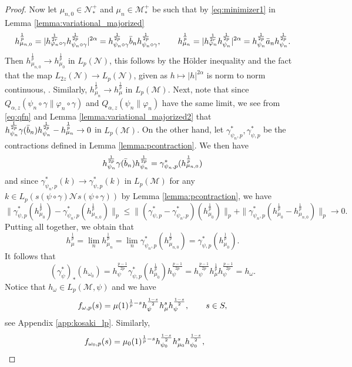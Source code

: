 \documentclass[12pt]{article}
\theoremstyle{definition}
\theoremstyle{remark}
\numberwithin{equation}{section}
\def\Me{\mathcal M}
\def\Ne{\mathcal N}
\def\ffi{\varphi}
\begin{document}
\begin{proof}
Now let $\mu_{n,0}\in \Ne_*^+$ and $\mu_n\in \Me_*^+$ be such that by  \eqref{eq:minimizer1}
in Lemma \ref{lemma:variational_majorized}
\begin{align*}
h_{\mu_{n,0}}^{\frac 1p}= |h_{\ffi_n\circ\gamma}^{1\over 2r}h_{\psi_n\circ\gamma}^{1\over 2p}|^{2\alpha}=
h_{\psi_n\circ\gamma}^{\frac 1{2p}}\bar b_{n}
h_{\psi_n\circ\gamma}^{\frac1{2p}},\qquad
h_{\mu_{n}}^{\frac1p}=|h_{\ffi_n}^{1\over 2r}h_{\psi_n}^{1\over 2p}|^{2\alpha}= h_{\psi_n}^{\frac 1{2p}}\bar a_{n}
h_{\psi_n}^{\frac1{2p}}. 
\end{align*}
Then $h_{\mu_{n,0}}^{\frac1p}\to h_{\mu_0}^{\frac1p}$ in $L_p(\Ne)$, this follows by the H\"older
inequality and the fact that the map $L_{2z}(\Ne)\to L_p(\Ne)$, given as $h\mapsto
|h|^{2\alpha}$ is norm to norm continuous, \cite{kosaki1986aplicationsuc}. Similarly,
$h_{\mu_n}^{\frac1p}\to h_\mu^{\frac1p}$ in $L_p(\Me)$. 
Next, note that since
$Q_{\alpha,z}(\psi_n\circ\gamma\|\ffi_n\circ\gamma)$ and $Q_{\alpha,z}(\psi_n\|\ffi_n)$
have the same limit, we see from \eqref{eq:qfn} and Lemma
\ref{lemma:variational_majorized2} that 
$h_{\psi_n}^{\frac 1{2p}}\gamma(\bar b_{n})h_{\psi_n}^{1\over 2p}-h_{\mu_n}^{\frac1p}\to
0$ in $L_p(\Me)$. On the other hand, let $\gamma^*_{\psi_n,p}, \gamma^*_{\psi,p}$ be the
contractions defined in Lemma \ref{lemma:pcontraction}. We
then have 
\[
h_{\psi_n}^{\frac 1{2p}}\gamma(\bar b_{n})h_{\psi_n}^{1\over
2p}=\gamma_{\psi_{n},p}^*(h_{\mu_{n,0}}^{\frac1p})
\]
and since $\gamma^*_{\psi_{n},p}(k)\to \gamma^*_{\psi,p}(k)$ in $L_p(\Me)$ for any
$k\in L_p(s(\psi\circ\gamma)\Ne s(\psi\circ\gamma))$ by Lemma \ref{lemma:pcontraction}, we have 
\[
\|\gamma^*_{\psi,p}(h_{\mu_0}^{\frac1p})-\gamma_{\psi_{n},p}^*(h_{\mu_{n,0}}^{\frac1p})\|_p\le
\|(\gamma^*_{\psi,p}-\gamma^*_{\psi_{n},p})(h_{\mu_0}^{\frac1p})\|_p+
\|\gamma^*_{\psi_{n},p}(h_{\mu_0}^{\frac1p}-h_{\mu_{n,0}}^{\frac1p})\|_p\to 0.
\]
Putting all together, we obtain that 
\[
h_\mu^{\frac1p}=\lim_n h_{\mu_n}^{\frac1p}=\lim_n
\gamma^*_{\psi_{n},p}(h_{\mu_{n,0}}^{\frac1p})=\gamma^*_{\psi,p}(h_{\mu_0}^{\frac1p}).
\]
It follows that 
\[
(\gamma^*_{\psi})_*(h_{\omega_0})=h_{\psi}^{\frac{p-1}{2p}}\gamma^*_{\psi,p}(h_{\mu_0}^{\frac1p})h_{\psi}^{\frac{p-1}{2p}}=h_{\psi}^{\frac{p-1}{2p}}h_\mu^{\frac1p}h_{\psi}^{\frac{p-1}{2p}}=h_\omega.
\]
Notice that $h_\omega\in L_p(\Me,\psi)$ and we have
\[
f_{\omega,p}(s)=\mu(1)^{\frac1p-s} h_\psi^{1-s\over 2}h_\mu^sh_\psi^{1-s\over 2},\qquad
s\in S,
\]
see Appendix \ref{app:kosaki_lp}. Similarly,
\[
f_{\omega_0,p}(s)=\mu_0(1)^{\frac1p-s} h_{\psi_0}^{1-s\over 2}h_{\mu_0}^sh_{\psi_0}^{1-s\over 2},\qquad
\]
\end{proof}
\end{document}

